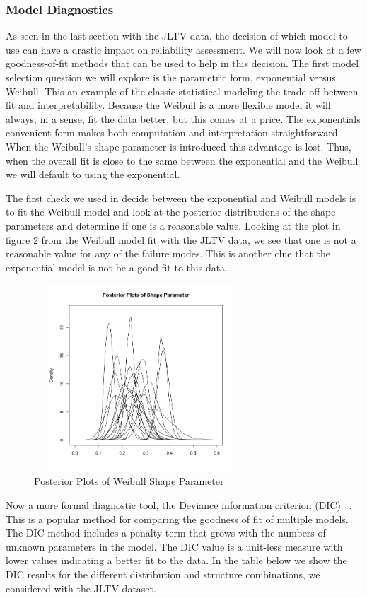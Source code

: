 \documentclass[12pt]{article}
\begin{document}
\subsubsection{Model Diagnostics}
As seen in the last section with the JLTV data, the decision of which model to
use can have a drastic impact on reliability assessment.  We will now look at a
few  goodness-of-fit methods that can be used to help in this decision.  The
first model selection question we will explore is the parametric form,
exponential versus Weibull.  This an example of the classic statistical modeling
the trade-off between fit and interpretability.  Because the Weibull is a more
flexible model it will always, in a sense, fit the data better, but this comes
at a price.  The exponentials convenient form makes both computation and
interpretation straightforward.  When the Weibull's shape parameter is
introduced this advantage is lost.  Thus, when the overall fit is close to the
same between the exponential and the Weibull we will default to using the
exponential.

The first check we used in decide between the exponential and Weibull models is
to fit the Weibull model and look at the posterior distributions of the shape
parameters and determine if one is a reasonable value.  Looking at the plot in
figure 2 from the Weibull model fit with the JLTV data, we see that one is
not a reasonable value for any of the failure modes.  This is another clue
that the exponential model is not be a good fit to this data.

\begin{figure}[h]
  \centering
      \includegraphics[width=8cm, height=7cm]{shapePostPlot}
  \caption{Posterior Plots of Weibull Shape Parameter}
\end{figure}

Now a more formal diagnostic tool, the Deviance information criterion (DIC)
~\cite{ref4}. This is a popular method for comparing the goodness of fit of
multiple models. The DIC method includes a penalty term that grows with the
numbers of unknown parameters in the model.  The DIC value is a unit-less
measure with lower values indicating a better fit to the data.  In the table
below we show the DIC results for the different distribution and structure
combinations, we considered with the JLTV dataset.
\end{document}
